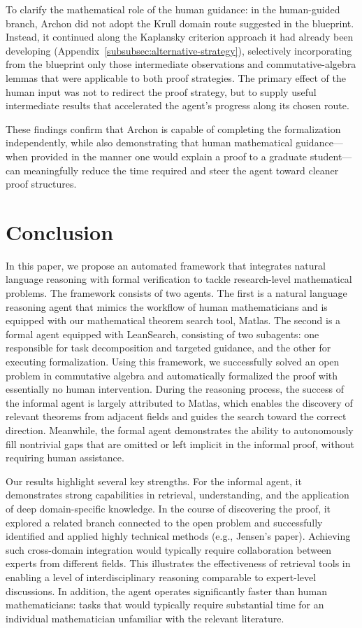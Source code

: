 \documentclass[]{pkuai4m}
\theoremstyle{plain}
\theoremstyle{definition}
\begin{document}
To clarify the mathematical role of the human guidance: in the human-guided branch, Archon did not adopt the Krull domain route suggested in the blueprint. Instead, it continued along the Kaplansky criterion approach it had already been developing (Appendix~\ref{subsubsec:alternative-strategy}), selectively incorporating from the blueprint only those intermediate observations and commutative-algebra lemmas that were applicable to both proof strategies. The primary effect of the human input was not to redirect the proof strategy, but to supply useful intermediate results that accelerated the agent's progress along its chosen route.

These findings confirm that Archon is capable of completing the formalization independently, while also demonstrating that human mathematical guidance---when provided in the manner one would explain a proof to a graduate student---can meaningfully reduce the time required and steer the agent toward cleaner proof structures.



\section{Conclusion}\label{sec:concl}
In this paper, we propose an automated framework that integrates natural language reasoning with formal verification to tackle research-level mathematical problems. The framework consists of two agents. The first is a natural language reasoning agent that mimics the workflow of human mathematicians and is equipped with our mathematical theorem search tool, Matlas. The second is a formal agent equipped with LeanSearch, consisting of two subagents: one responsible for task decomposition and targeted guidance, and the other for executing formalization. Using this framework, we successfully solved an open problem in commutative algebra \cite{cahen2014open} and automatically formalized the proof with essentially no human intervention. During the reasoning process, the success of the informal agent is largely attributed to Matlas, which enables the discovery of relevant theorems from adjacent fields and guides the search toward the correct direction. Meanwhile, the formal agent demonstrates the ability to autonomously fill nontrivial gaps that are omitted or left implicit in the informal proof, without requiring human assistance.

Our results highlight several key strengths. For the informal agent, it demonstrates strong capabilities in retrieval, understanding, and the application of deep domain-specific knowledge. In the course of discovering the proof, it explored a related branch connected to the open problem and successfully identified and applied highly technical methods (e.g., Jensen’s paper). Achieving such cross-domain integration would typically require collaboration between experts from different fields. This illustrates the effectiveness of retrieval tools in enabling a level of interdisciplinary reasoning comparable to expert-level discussions. In addition, the agent operates significantly faster than human mathematicians: tasks that would typically require substantial time for an individual mathematician unfamiliar with the relevant literature.
\end{document}
